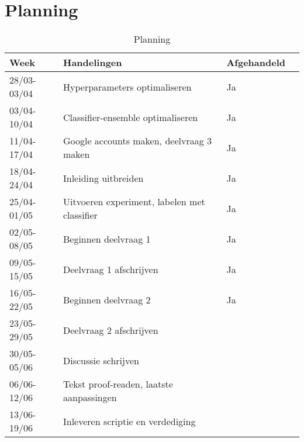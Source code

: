 \documentclass[../main.tex]{subfiles}
\begin{document}
\section{Planning}

\begin{table}[!b]
\centering
\caption{Planning}
\label{tab:planning}
\begin{tabular}{@{}ll@{}ll@{}}
\toprule
Week        & Handelingen                                                     & Afgehandeld \\ \midrule
28/03-03/04 & Hyperparameters optimaliseren                                   &     Ja      \\
03/04-10/04 & Classifier-ensemble optimaliseren                               &     Ja      \\
11/04-17/04 & Google accounts maken, deelvraag 3 maken                        &     Ja      \\
18/04-24/04 & Inleiding uitbreiden                                            &     Ja      \\
25/04-01/05 & Uitvoeren experiment, labelen met classifier                    &     Ja      \\
02/05-08/05 & Beginnen deelvraag 1                                            &     Ja      \\
09/05-15/05 & Deelvraag 1 afschrijven                                         &     Ja      \\
16/05-22/05 & Beginnen deelvraag 2                                            &     Ja      \\
23/05-29/05 & Deelvraag 2 afschrijven                                         &             \\
30/05-05/06 & Discussie schrijven                                             &             \\
06/06-12/06 & Tekst proof-readen, laatste aanpassingen                        &             \\
13/06-19/06 & Inleveren scriptie en verdediging                               &             \\ \bottomrule
\end{tabular}

\end{table}
\end{document}
